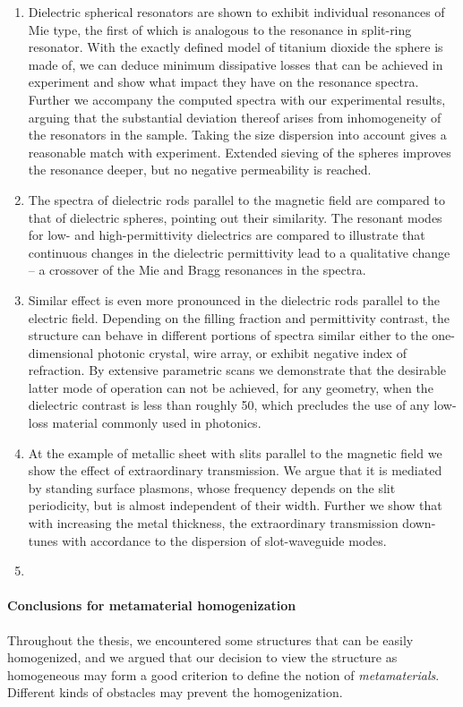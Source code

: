 \begin{enumerate}
{} 
\item{Dielectric spherical resonators are shown to exhibit individual resonances of Mie type, the first of which is analogous to the resonance in split-ring resonator. With the exactly defined model of titanium dioxide the sphere is made of, we can deduce minimum dissipative losses that can be achieved in experiment and show what impact they have on the resonance spectra. Further we accompany the computed spectra with our experimental results, arguing that the substantial deviation thereof arises from inhomogeneity of the resonators in the sample. Taking the size dispersion into account gives a reasonable match with experiment. Extended sieving of the spheres improves the resonance deeper, but no negative permeability is reached.
} 
\item{The spectra of dielectric rods parallel to the magnetic field are compared to that of dielectric spheres, pointing out their similarity. The resonant modes for low- and high-permittivity dielectrics are compared to illustrate that continuous changes in the dielectric permittivity lead to a qualitative change -- a crossover of the Mie and Bragg resonances in the spectra.
} 
\item{Similar effect is even more pronounced in the dielectric rods parallel to the electric field. Depending on the filling fraction and permittivity contrast, the structure can behave in different portions of spectra similar either to the one-dimensional photonic crystal, wire array, or exhibit negative index of refraction. By extensive parametric scans we demonstrate that the desirable latter mode of operation  can not be achieved, for any geometry, when the dielectric contrast is less than roughly 50, which precludes the use of any low-loss material commonly used in photonics. 
} 
\item{At the example of metallic sheet with slits parallel to the magnetic field we show the effect of extraordinary transmission. We argue that it is mediated by standing surface plasmons, whose frequency depends on the slit periodicity, but is almost independent of their width. Further we show that with increasing the metal thickness, the extraordinary transmission down-tunes with accordance to the dispersion of slot-waveguide modes.
} 
\item{%
}
\end{enumerate}

\paragraph{Conclusions for metamaterial homogenization}
Throughout the thesis, we encountered some structures that can be easily homogenized, and we argued that our decision to view the structure as homogeneous may form a good criterion to define the notion of \textit{metamaterials}. Different kinds of obstacles may prevent the homogenization.

